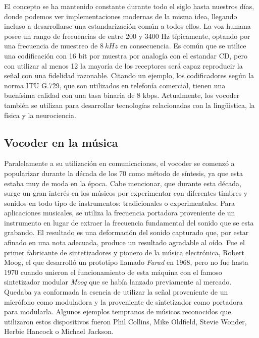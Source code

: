 El concepto se ha mantenido constante durante todo el siglo hasta nuestros días, donde podemos ver implementaciones modernas de la misma idea, llegando incluso a desarrollarse una estandarización común a todos ellos. La voz humana posee un rango de frecuencias de entre 200 y 3400 Hz típicamente, optando por una frecuencia de muestreo de $8~kHz$ en consecuencia. Es común que se utilice una codificación con 16 bit por muestra por analogía con el estandar CD, pero con utilizar al menos 12 la mayoría de los receptores será capaz reproducir la señal con una fidelidad razonable. Citando un ejemplo, los codificadores según la norma ITU G.729, que son utilizados en telefonía comercial, tienen una buenísima calidad con una tasa binaria de 8 kbps. Actualmente, los vocoder también se utilizan para desarrollar tecnologías relacionadas con la lingüistica, la física y la neurociencia.

\subsection{Vocoder en la música}
Paralelamente a su utilización en comunicaciones, el vocoder se comenzó a popularizar durante la década de los 70 como método de síntesis, ya que esta estaba muy de moda en la época. Cabe mencionar, que durante esta década, surge un gran interés en los músicos por experimentar con diferentes timbres y sonidos en todo tipo de instrumentos: tradicionales o experimentales. Para aplicaciones musicales, se utiliza la frecuencia portadora proveniente de un instrumento en lugar de extraer la frecuencia fundamental del sonido que se esta grabando. El resultado es una deformación del sonido capturado que, por estar afinado en una nota adecuada, produce un resultado agradable al oído. Fue el primer fabricante de sintetizadores y pionero de la música electrónica, Robert Moog, el que desarrolló un prototipo llamado \emph{Farad} en 1968, pero no fue hasta 1970 cuando unieron el funcionamiento de esta máquina con el famoso sintetizador modular \emph{Moog} que se había lanzado previamente al mercado. Quedaba ya conformada la esencia de utilizar la señal proveniente de un micrófono como moduladora y la proveniente de sintetizador como portadora para modularla. Algunos ejemplos tempranos de músicos reconocidos que utilizaron estos dispositivos fueron Phil Collins, Mike Oldfield, Stevie Wonder, Herbie Hancock o Michael Jackson.

